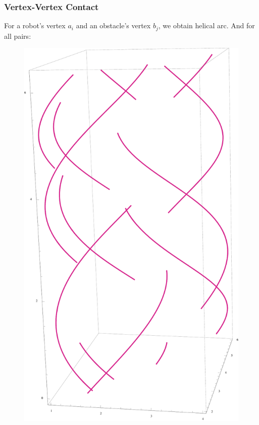 \documentclass[ucs,9pt,pagenumbersfull]{beamer}
\begin{document}
\begin{frame}
  \frametitle{Vertex-Vertex Contact}
  For a robot's vertex \(a_i\) and an obstacle's vertex \(b_j\), we
  obtain helical arc. And for all pairs:

  \begin{figure}
    \centering
    \includegraphics[scale=0.2]{Figures/vvcontact_config}
  \end{figure}
\end{frame}
\end{document}
